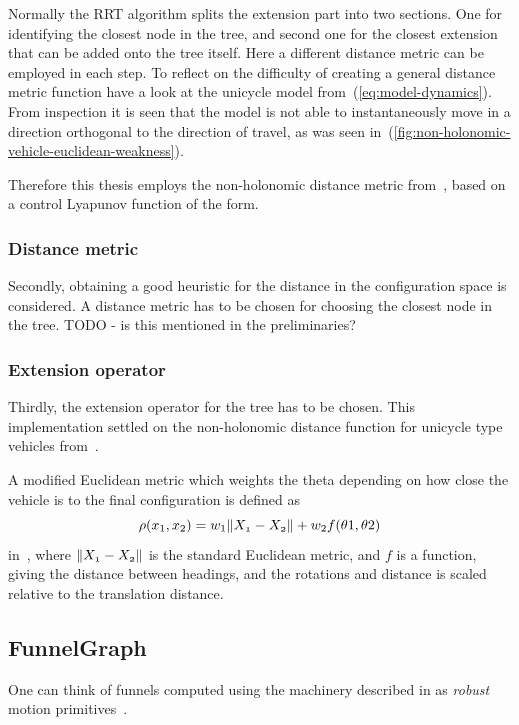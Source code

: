 Normally the \ac{RRT} algorithm splits the extension part into two sections. One
for identifying the closest node in the tree, and second one for the closest
extension that can be added onto the tree itself. Here a different distance
metric can be employed in each step. To reflect on the difficulty of creating a
general distance metric function have a look at the unicycle model
from~(\ref{eq:model-dynamics}). From inspection it is seen that the model is not
able to instantaneously move in a direction orthogonal to the direction of
travel, as was seen in~(\ref{fig:non-holonomic-vehicle-euclidean-weakness}).

Therefore this thesis employs the non-holonomic distance metric
from~\cite{parkFeedbackMotionPlanning2015}, based on a control Lyapunov function
of the form.

\subsubsection{Distance metric}
Secondly, obtaining a good heuristic for the distance in the configuration space
is considered. A distance metric has to be chosen for choosing the closest node in
the tree. TODO - is this mentioned in the preliminaries?

\subsubsection{Extension operator}
Thirdly, the extension operator for the tree has to be chosen. This
implementation settled on the non-holonomic distance function for unicycle type
vehicles from~\cite{parkFeedbackMotionPlanning2015}.

A modified Euclidean metric which weights the theta depending on how close the
vehicle is to the final configuration is defined as
\[
  \rho(x_{1},x_{2}) = w_{1}\lVert\mathnormal{X_{1}} - \mathnormal{X_{2}}\rVert +
  w_{2}f(\theta{1},\theta{2})
\]
in~\cite{kuffnerEffectiveSamplingDistance2004}, where \(\lVert\mathnormal{X_{1}}
  - \mathnormal{X_{2}}\rVert\) is the standard Euclidean metric, and \(f\) is a
function, giving the distance between headings, and the rotations and distance
is scaled relative to the translation distance.

\subsection{FunnelGraph}

One can think of funnels computed using the machinery described in
\cite[sec~4]{majumdarFunnelLibrariesRealtime2017} as \textit{robust} motion
primitives~\cite{majumdarFunnelLibrariesRealtime2017}.


